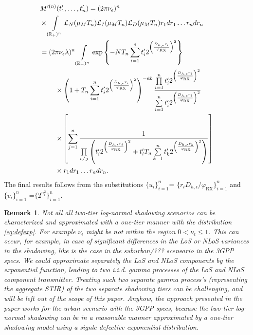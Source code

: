 \documentclass[lettersize,journal]{IEEEtran}
\newcommand{\R}{\mathbb{R}}
\newtheorem*{remark}{Remark}
\begin{document}
\begin{align}
  &M'^{(n)}(t'_1,\dots,t'_n) =(2 \pi \nu_{\epsilon})^n\nonumber\\
  & \times\int\limits_{(\R_+)^n} \mathcal{L}_N(\mu_MT_n)\mathcal{L}_I(\mu_MT_n)\mathcal{L}_D(\mu_MT_n) r_1 dr_1 \dots r_n dr_n\nonumber \\
  &=(2 \pi \nu_{\epsilon} \lambda)^n \int\limits_{(\R_+)^n} \exp\left\{-NT_n\sum\limits_{i=1}^nt'_i2^{\left(\frac{D_{h,\epsilon}r_i}{\varphi_{\text{RX}}}\right)^2}\right\} \nonumber\\
  &\hspace{0.8cm}\times\left(1+T_n\sum\limits_{i=1}^nt'_i2^{\left(\frac{D_{h,\epsilon}r_i}{\varphi_{\text{RX}}}\right)^2}\right)^{- \tilde{\kappa}b} \frac{\prod\limits_{i=1}^nt'_i2^{\left(\frac{D_{h,\epsilon}r_i}{\varphi_{\text{RX}}}\right)^2}}{\sum\limits_{i=1}^nt'_i2^{\left(\frac{D_{h,\epsilon}r_i}{\varphi_{\text{RX}}}\right)^2}} \nonumber\\
  &\hspace{0.8cm}\times  \left[\sum\limits_{j=1}^n\frac{1}{\prod\limits_{i\neq j}\left(t'_i 2^{\left(\frac{D_{h,\epsilon}r_i}{\varphi_{\text{RX}}}\right)^2}+ t_i'T_n\sum\limits_{k=1}^nt'_k2^{\left(\frac{D_{h,\epsilon}r_k}{\varphi_{\text{RX}}}\right)^2} \right)} \right] \nonumber\\
  &\hspace{0.8cm}\times r_1 dr_1 \dots r_n dr_n.
\end{align}
The final results follows from the substitutions $\{u_i\}_{i= 1}^n$= $\{r_i D_{h,\epsilon}/\varphi_{\text{RX}}\}_{i= 1}^n$ and $\{v_i\}_{i= 1}^n$ =$\{ 2^{u^2_i}\}_{i= 1}^n$.





\begin{remark}
  Not all all two-tier log-normal shadowing scenarios can be characterized and approximated with a one-tier manner with the distribution \eqref{eq:defexp}. For example $\nu_{\epsilon}$ might be not within the region $0<\nu_{\epsilon} \leq 1$. This can occur, for example, in case of significant differences in the LoS or NLoS variances in the shadowing, like is the case in the suburban/??? sceneario in the 3GPP specs. We could approximate separately the LoS and NLoS components by the exponential function, leading to two i.i.d. gamma processes of the LoS and NLoS component transmitter. Treating such two separate gamma process's (representing the aggregate STIR) of the two separate shadowing tiers can be challenging, and will be left out of the scope of this paper. Anyhow, the approach presented in the paper works for the urban scenario with the 3GPP specs, because the two-tier log-normal shadowing can be in a reasonable manner approximated by a one-tier shadowing model using a signle defective exponential distribution.
\end{remark}



%

\end{document}

